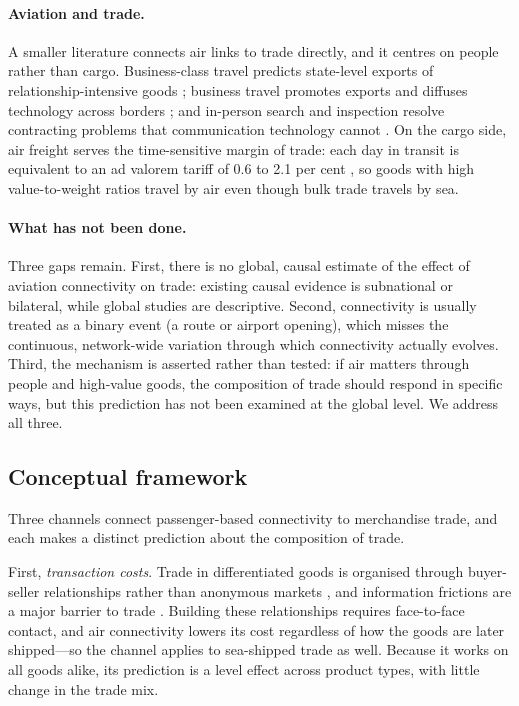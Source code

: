 \paragraph{Aviation and trade.} A smaller literature connects air links to
trade directly, and it centres on people rather than cargo. Business-class
travel predicts state-level exports of relationship-intensive goods
\citep{Cristea_2011}; business travel promotes exports
\citep{Belenkiy_2012} and diffuses technology across borders
\citep{Hovhannisyan_2015}; and in-person search and inspection resolve
contracting problems that communication technology cannot
\citep{Startz_2016}. On the cargo side, air freight serves the time-sensitive
margin of trade: each day in transit is equivalent to an ad valorem tariff of
0.6 to 2.1 per cent \citep{Hummels_2013}, so goods with high value-to-weight
ratios travel by air even though bulk trade travels by sea.

\paragraph{What has not been done.} Three gaps remain. First, there is no
global, causal estimate of the effect of aviation connectivity on trade:
existing causal evidence is subnational or bilateral, while global studies are
descriptive. Second, connectivity is usually treated as a binary event (a
route or airport opening), which misses the continuous, network-wide variation
through which connectivity actually evolves. Third, the mechanism is asserted
rather than tested: if air matters through people and high-value goods, the
composition of trade should respond in specific ways, but this prediction has
not been examined at the global level. We address all three.

\subsection{Conceptual framework}
\label{sec:framework}
Three channels connect passenger-based connectivity to merchandise trade, and
each makes a distinct prediction about the composition of trade.

First, \emph{transaction costs}. Trade in differentiated goods is organised
through buyer-seller relationships rather than anonymous markets
\citep{Rauch_1999}, and information frictions are a major barrier to trade
\citep{Allen_2014}. Building these relationships requires face-to-face
contact, and air connectivity lowers its cost regardless of how the goods are
later shipped---so the channel applies to sea-shipped trade as well. Because
it works on all goods alike, its prediction is a level effect across product
types, with little change in the trade mix.


